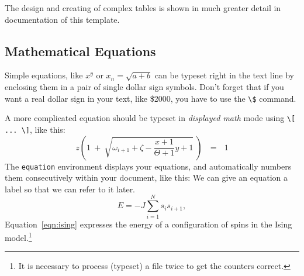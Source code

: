 The design and creating of complex tables is shown in much greater detail in documentation of this template.

\subsection{Mathematical Equations}
\label{sec:example:math}

Simple equations, like $x^y$ or $x_n = \sqrt{a + b}$ can be typeset right
in the text line by enclosing them in a pair of single dollar sign symbols.
Don't forget that if you want a real dollar sign in your text, like \$2000,
you have to use the \verb+\$+ command.

A more complicated equation should be typeset in \emph{displayed math} mode using \texttt{\textbackslash{[} ... \textbackslash{]}}, like this:
%
\[
z \left( 1 \ +\  \sqrt{\omega_{i+1} + \zeta -\frac{x+1}{\Theta +1} y + 1} 
\ \right)
\ \ \ =\ \ \  1
\]
%
The \texttt{equation} environment displays your equations, and automatically
numbers them consecutively within your document, like this:
%
We can give an equation a label so that we can refer to it later.
\begin{equation}
  \label{eqn:ising}
  E = -J \sum_{i=1}^N s_i s_{i+1} ,
\end{equation}
Equation~\eqref{eqn:ising} expresses the energy of a configuration
of spins in the Ising model.\footnote{It is necessary to process (typeset) a
file twice to get the counters correct.}

